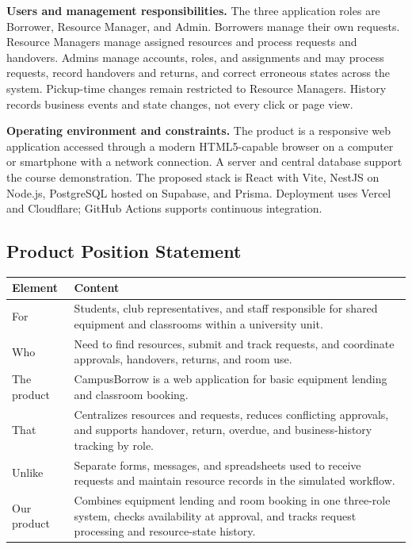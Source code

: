 \documentclass[11pt]{article}
\begin{document}
\textbf{Users and management responsibilities.} The three application roles are Borrower, Resource Manager, and Admin. Borrowers manage their own requests. Resource Managers manage assigned resources and process requests and handovers. Admins manage accounts, roles, and assignments and may process requests, record handovers and returns, and correct erroneous states across the system. Pickup-time changes remain restricted to Resource Managers. History records business events and state changes, not every click or page view.

\textbf{Operating environment and constraints.} The product is a responsive web application accessed through a modern HTML5-capable browser on a computer or smartphone with a network connection. A server and central database support the course demonstration. The proposed stack is React with Vite, NestJS on Node.js, PostgreSQL hosted on Supabase, and Prisma. Deployment uses Vercel and Cloudflare; GitHub Actions supports continuous integration.

\subsection{Product Position Statement}
\begin{tabularx}{\textwidth}{@{}L{2.0cm}Y@{}}
\toprule
\textbf{Element} & \textbf{Content} \\
\midrule
For & Students, club representatives, and staff responsible for shared equipment and classrooms within a university unit. \\
Who & Need to find resources, submit and track requests, and coordinate approvals, handovers, returns, and room use. \\
The product & CampusBorrow is a web application for basic equipment lending and classroom booking. \\
That & Centralizes resources and requests, reduces conflicting approvals, and supports handover, return, overdue, and business-history tracking by role. \\
Unlike & Separate forms, messages, and spreadsheets used to receive requests and maintain resource records in the simulated workflow. \\
Our product & Combines equipment lending and room booking in one three-role system, checks availability at approval, and tracks request processing and resource-state history. \\
\bottomrule
\end{tabularx}
\end{document}
